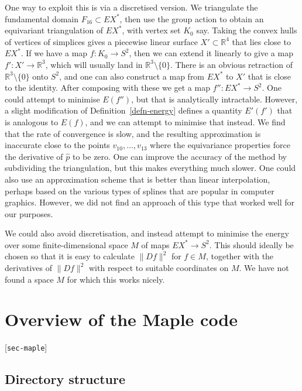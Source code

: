 \documentclass[reqno]{amsart}
\newcommand{\lbl}[1]{\label{#1}\textup{[\texttt{#1}]}\par}
\newcommand{\lbl}{\label}
\newcommand{\R}         {{\mathbb{R}}}
\newcommand{\sm}        {\setminus}
\newcommand{\hp}        {\widehat{p}}
\renewcommand{\:}{\colon}
\theoremstyle{definition}
\begin{document}
One way to exploit this is via a discretised version.  We triangulate
the fundamental domain $F_{16}\subset EX^*$, then use the group action
to obtain an equivariant triangulation of $EX^*$, with vertex set
$K_0$ say.  Taking the convex hulls of vertices of simplices gives a
piecewise linear surface $X'\subset\R^4$ that lies close to $EX^*$.
If we have a map $f\:K_0\to S^2$, then we can extend it linearly to
give a map $f'\:X'\to\R^3$, which will usually land in $\R^3\sm\{0\}$.
There is an obvious retraction of $\R^3\sm\{0\}$ onto $S^2$, and one
can also construct a map from $EX^*$ to $X'$ that is close to the
identity.  After composing with these we get a map $f''\:EX^*\to S^2$.
One could attempt to minimise $E(f'')$, but that is analytically
intractable.  However, a slight modification of
Definition~\ref{defn-energy} defines a quantity $E'(f')$ that is
analogous to $E(f)$, and we can attempt to minimise that instead.  We
find that the rate of convergence is slow, and the resulting
approximation is inaccurate close to the points $v_{10},\dotsc,v_{13}$
where the equivariance properties force the derivative of $\hp$ to be
zero.  One can improve the accuracy of the method by subdividing the
triangulation, but this makes everything much slower.  One could also
use an approximation scheme that is better than linear interpolation,
perhaps based on the various types of splines that are popular in
computer graphics.  However, we did not find an approach of this type
that worked well for our purposes.

We could also avoid discretisation, and instead attempt to minimise
the energy over some finite-dimensional space $M$ of maps
$EX^*\to S^2$.  This should ideally be chosen so that it is easy to
calculate $\|Df\|^2$ for $f\in M$, together with the derivatives of
$\|Df\|^2$ with respect to suitable coordinates on $M$.  We have not
found a space $M$ for which this works nicely.


\section{Overview of the Maple code}
\lbl{sec-maple}

\subsection{Directory structure}
\end{document}
